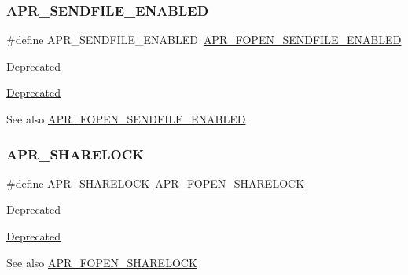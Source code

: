 \subsubsection{\texorpdfstring{A\+P\+R\+\_\+\+S\+E\+N\+D\+F\+I\+L\+E\+\_\+\+E\+N\+A\+B\+L\+ED}{APR\_SENDFILE\_ENABLED}}
{\footnotesize\ttfamily \#define A\+P\+R\+\_\+\+S\+E\+N\+D\+F\+I\+L\+E\+\_\+\+E\+N\+A\+B\+L\+ED~\mbox{\hyperlink{group__apr__file__open__flags_ga60c21e28e4a612d58a874fe2cc71a6e4}{A\+P\+R\+\_\+\+F\+O\+P\+E\+N\+\_\+\+S\+E\+N\+D\+F\+I\+L\+E\+\_\+\+E\+N\+A\+B\+L\+ED}}}

\begin{DoxyRefDesc}{Deprecated}
\item[\mbox{\hyperlink{deprecated__deprecated000029}{Deprecated}}]\end{DoxyRefDesc}
\begin{DoxySeeAlso}{See also}
\mbox{\hyperlink{group__apr__file__open__flags_ga60c21e28e4a612d58a874fe2cc71a6e4}{A\+P\+R\+\_\+\+F\+O\+P\+E\+N\+\_\+\+S\+E\+N\+D\+F\+I\+L\+E\+\_\+\+E\+N\+A\+B\+L\+ED}} 
\end{DoxySeeAlso}
\mbox{\label{group__apr__file__open__flags_ga41277154f4f754a22287ed90e9466811}} 
\subsubsection{\texorpdfstring{A\+P\+R\+\_\+\+S\+H\+A\+R\+E\+L\+O\+CK}{APR\_SHARELOCK}}
{\footnotesize\ttfamily \#define A\+P\+R\+\_\+\+S\+H\+A\+R\+E\+L\+O\+CK~\mbox{\hyperlink{group__apr__file__open__flags_ga426f6e2a8457ab410d99248269059a18}{A\+P\+R\+\_\+\+F\+O\+P\+E\+N\+\_\+\+S\+H\+A\+R\+E\+L\+O\+CK}}}

\begin{DoxyRefDesc}{Deprecated}
\item[\mbox{\hyperlink{deprecated__deprecated000027}{Deprecated}}]\end{DoxyRefDesc}
\begin{DoxySeeAlso}{See also}
\mbox{\hyperlink{group__apr__file__open__flags_ga426f6e2a8457ab410d99248269059a18}{A\+P\+R\+\_\+\+F\+O\+P\+E\+N\+\_\+\+S\+H\+A\+R\+E\+L\+O\+CK}} 
\end{DoxySeeAlso}
\mbox{\label{group__apr__file__open__flags_gaa8898fdebd69d3a64286731b713a6dc9}} 
